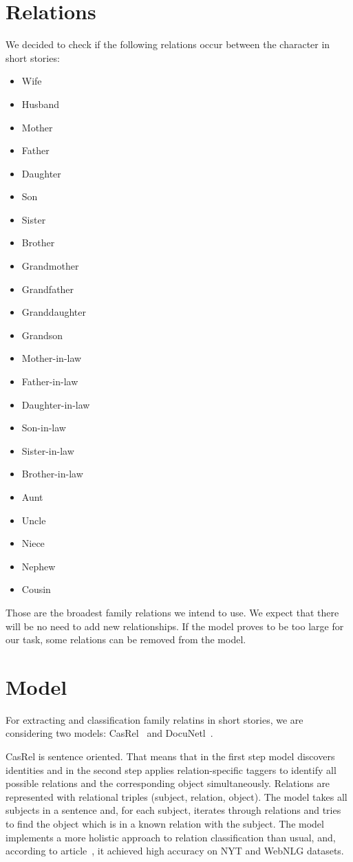 \documentclass[fleqn,moreauthors,10pt]{ds_report}
\begin{document}
\section*{Relations}

We decided to check if the following relations occur between the character in short stories:

\begin{itemize}
\itemsep0em
\item Wife
\item Husband
\item Mother
\item Father
\item Daughter
\item Son
\item Sister
\item Brother
\item Grandmother
\item Grandfather
\item Granddaughter
\item Grandson
\item Mother-in-law
\item Father-in-law
\item Daughter-in-law
\item Son-in-law
\item Sister-in-law
\item Brother-in-law
\item Aunt
\item Uncle
\item Niece
\item Nephew
\item Cousin
\end{itemize}

Those are the broadest family relations we intend to use. We expect that there will be no need to add new relationships. If the model proves to be too large for our task, some relations can be removed from the model.

\section*{Model}

For extracting and classification family relatins in short stories, we are considering two models: CasRel~\cite{wei2020CasRel} and DocuNetl~\cite{ijcai2021-551}.

CasRel is sentence oriented. That means that in the first step model discovers identities and in the second step applies relation-specific taggers to identify all possible relations and the corresponding object simultaneously. Relations are represented with relational triples (subject, relation, object). The model takes all subjects in a sentence and, for each subject, iterates through relations and tries to find the object which is in a known relation with the subject. The model implements a more holistic approach to relation classification than usual, and, according to article~\cite{wei2020CasRel}, it achieved high accuracy on NYT and WebNLG datasets.
\end{document}
